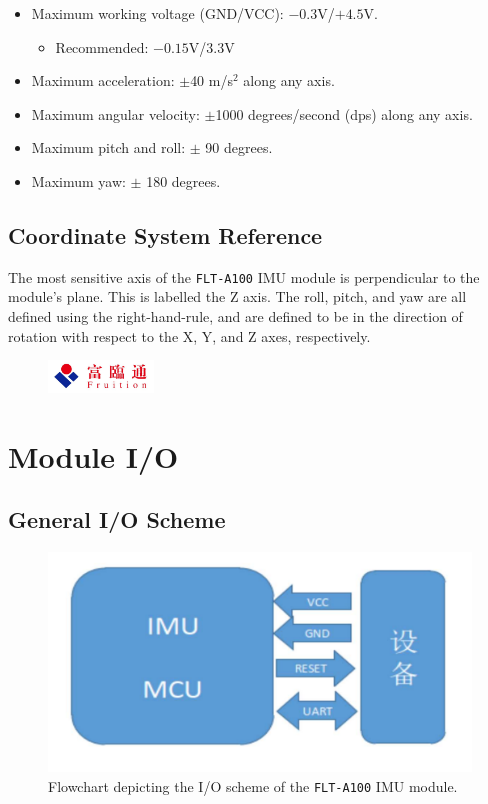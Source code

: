 \documentclass{scrreprt}
\newcommand{\pchapter}[1]{
	\begingroup\let\clearpage\relax
	\newpage
	\begin{figure}[H]
		\includegraphics[width=0.25\textwidth]{logo.jpeg}
	\end{figure}
	\chapter{#1}
	\endgroup
}
\newcommand{\modelno}{%
	\texttt{FLT-A100}
}
\begin{document}
\begin{CJK*}{UTF8}{gbsn}
\begin{itemize}
\item Maximum working voltage (GND/VCC): $-0.3$V/$+4.5$V.
	\begin{itemize}
	\item Recommended: $-0.15$V/$3.3$V
	\end{itemize}

\item Maximum acceleration: $\pm$40 m/s$^2$ along any axis.

\item Maximum angular velocity: $\pm$1000 degrees/second (dps) along any axis.

\item Maximum pitch and roll: $\pm$ 90 degrees.

\item Maximum yaw: $\pm$ 180 degrees.
\end{itemize}

\section{Coordinate System Reference}
The most sensitive axis of the \modelno IMU module is perpendicular to the
module's plane. This is labelled the Z axis. The roll, pitch, and yaw are all
defined using the right-hand-rule, and are defined to be in the direction of
rotation with respect to the X, Y, and Z axes, respectively.

\pchapter{Module I/O}
\section{General I/O Scheme}
\begin{figure}[H]
\caption{Flowchart depicting the I/O scheme of the \modelno IMU module.}
\centering\includegraphics{module_io}
\end{figure}


\end{CJK*}
\end{document}
